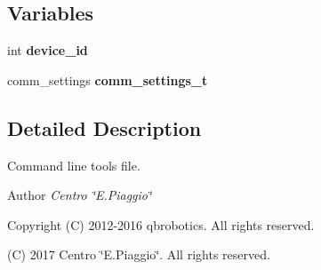 \subsection*{Variables}
\begin{DoxyCompactItemize}
\item 
\mbox{\label{qbmove__pos__stiff__demo_8c_accfd0301c469314772cc651ec198d492}} 
int {\bfseries device\+\_\+id}
\item 
\mbox{\label{qbmove__pos__stiff__demo_8c_a92153f4b70cd8ba4e9b502ccff8d28bf}} 
comm\+\_\+settings {\bfseries comm\+\_\+settings\+\_\+t}
\end{DoxyCompactItemize}


\subsection{Detailed Description}
Command line tools file. 

\begin{DoxyAuthor}{Author}
{\itshape Centro \char`\"{}\+E.\+Piaggio\char`\"{}} 
\end{DoxyAuthor}
\begin{DoxyCopyright}{Copyright}
(C) 2012-\/2016 qbrobotics. All rights reserved. 

(C) 2017 Centro \char`\"{}\+E.\+Piaggio\char`\"{}. All rights reserved. 
\end{DoxyCopyright}

